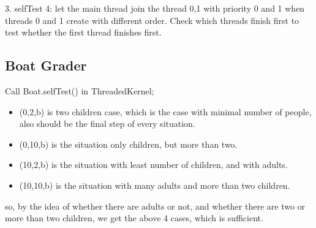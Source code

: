 \documentclass[a4paper,10pt]{article}
\begin{document}
3.  selfTest 4: let the main thread join the thread 0,1 with priority 0 and 1 when threads 0 and 1 create with different order. Check which threads finish first to test whether the first thread finishes first.
\subsection{Boat Grader}
Call Boat.selfTest() in ThreadedKernel;
\begin{itemize}
\item (0,2,b) is two children case, which is the case with minimal number of people, also should be the final step of every situation.
\item (0,10,b) is the situation only children, but more than two.
\item (10,2,b) is the situation with least number of children, and with adults.
\item (10,10,b) is the situation with many adults and more than two children.
\end{itemize}
so, by the idea of whether there are adults or not, and whether there are two or more than two children, we get the above 4 cases, which is sufficient.
\end{document}
